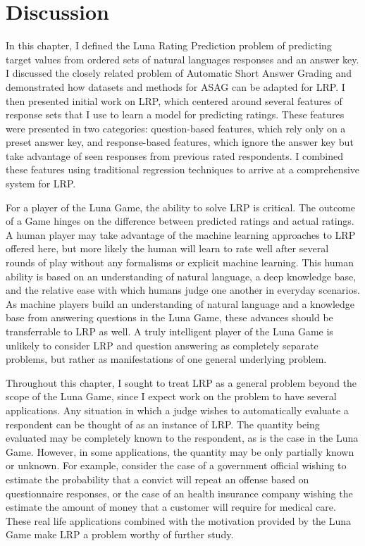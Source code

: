 \section{Discussion}
In this chapter, I defined the Luna Rating Prediction problem of predicting target values from ordered sets of natural languages responses and an answer key. I discussed the closely related problem of Automatic Short Answer Grading and demonstrated how datasets and methods for ASAG can be adapted for LRP. I then presented initial work on LRP, which centered around several features of response sets that I use to learn a model for predicting ratings. These features were presented in two categories: question-based features, which rely only on a preset answer key, and response-based features, which ignore the answer key but take advantage of seen responses from previous rated respondents. I combined these features using traditional regression techniques to arrive at a comprehensive system for LRP.

For a player of the Luna Game, the ability to solve LRP is critical. The outcome of a Game hinges on the difference between predicted ratings and actual ratings. A human player may take advantage of the machine learning approaches to LRP offered here, but more likely the human will learn to rate well after several rounds of play without any formalisms or explicit machine learning. This human ability is based on an understanding of natural language, a deep knowledge base, and the relative ease with which humans judge one another in everyday scenarios. As machine players build an understanding of natural language and a knowledge base from answering questions in the Luna Game, these advances should be transferrable to LRP as well. A truly intelligent player of the Luna Game is unlikely to consider LRP and question answering as completely separate problems, but rather as manifestations of one general underlying problem.

Throughout this chapter, I sought to treat LRP as a general problem beyond the scope of the Luna Game, since I expect work on the problem to have several applications. Any situation in which a judge wishes to automatically evaluate a respondent can be thought of as an instance of LRP. The quantity being evaluated may be completely known to the respondent, as is the case in the Luna Game. However, in some applications, the quantity may be only partially known or unknown. For example, consider the case of a government official wishing to estimate the probability that a convict will repeat an offense based on questionnaire responses, or the case of an health insurance company wishing the estimate the amount of money that a customer will require for medical care. These real life applications combined with the motivation provided by the Luna Game make LRP a problem worthy of further study.

